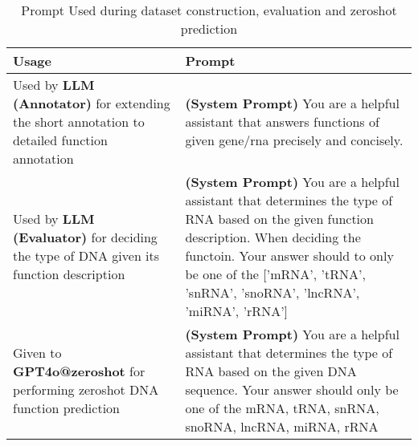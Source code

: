 \begin{table}[h]
    \centering
    \renewcommand{\arraystretch}{1.5}
    \begin{tabular}{|p{5cm}|p{10cm}|}
        \hline
        \textbf{Usage}  & \textbf{Prompt} \\
        \hline
          Used  by \textbf{LLM (Annotator)} for extending the short annotation to detailed function annotation& 
          \textbf{(System Prompt)} You are a helpful assistant that answers functions of given gene/rna precisely and concisely.
         \\
        \hline
        Used by \textbf{LLM (Evaluator)} for deciding the type of DNA given its function description & 
        \textbf{(System Prompt)} You are a helpful assistant that determines the type of RNA based on the given function description. When deciding the functoin. Your answer should to only be one of the ['mRNA', 'tRNA', 'snRNA', 'snoRNA', 'lnc\-RNA', 'miRNA', 'rRNA'] \\
        \hline
        Given to \textbf{GPT4o@zeroshot} for performing zeroshot DNA function prediction & 
        \textbf{(System Prompt)} You are a helpful assistant that determines the type of RNA based on the given DNA sequence. Your answer should only be one of the mRNA, tRNA, snRNA, snoRNA, lnc\-RNA, miRNA, rRNA\\
        \hline
       
    \end{tabular}
    \caption{Prompt Used during dataset construction, evaluation and zeroshot prediction}
    \label{tab:prompt-for-dna2func}
\end{table}


